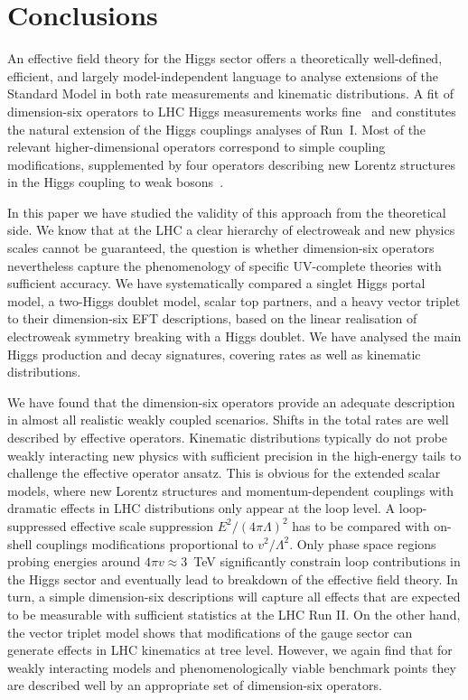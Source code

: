 \section{Conclusions}
\label{sec:validity_conclusions}

An effective field theory for the Higgs sector offers a theoretically
well-defined, efficient, and largely model-independent language to
analyse extensions of the Standard Model in both rate measurements and
kinematic distributions. A fit of dimension-six operators to LHC Higgs
measurements works fine~\cite{Corbett:2015ksa} and constitutes the
natural extension of the Higgs couplings analyses of Run~I.  Most of
the relevant higher-dimensional operators correspond to simple
coupling modifications, supplemented by four operators describing new
Lorentz structures in the Higgs coupling to weak
bosons~\cite{Corbett:2015ksa}.

In this paper we have studied the validity of this approach from the
theoretical side.  We know that at the LHC a clear hierarchy of
electroweak and new physics scales cannot be guaranteed, the question
is whether dimension-six operators nevertheless capture the
phenomenology of specific UV-complete theories with sufficient
accuracy.  We have systematically compared a singlet Higgs portal
model, a two-Higgs doublet model, scalar top partners, and a heavy
vector triplet to their dimension-six EFT descriptions, based on the
linear realisation of electroweak symmetry breaking with a Higgs
doublet.  We have analysed the main Higgs production and decay
signatures, covering rates as well as kinematic distributions.

We have found that the dimension-six operators provide an adequate
description in almost all realistic weakly coupled scenarios. Shifts
in the total rates are well described by effective operators.
Kinematic distributions typically do not probe weakly interacting new
physics with sufficient precision in the high-energy tails to
challenge the effective operator ansatz.  This is obvious for the
extended scalar models, where new Lorentz structures and
momentum-dependent couplings with dramatic effects in LHC
distributions only appear at the loop level.  A loop-suppressed
effective scale suppression $E^2/(4 \pi \Lambda)^2$ has to be compared
with on-shell couplings modifications proportional to $v^2/\Lambda^2$.
Only phase space regions probing energies around $4 \pi v \approx
3$~TeV significantly constrain loop contributions in the Higgs sector
and eventually lead to breakdown of the effective field theory. In
turn, a simple dimension-six descriptions will capture all effects that
are expected to be measurable with sufficient statistics at the LHC
Run II.  On the other hand, the vector triplet model shows that
modifications of the gauge sector can generate effects in LHC
kinematics at tree level. However, we again find that for weakly
interacting models and phenomenologically viable benchmark points they
are described well by an appropriate set of dimension-six
operators.

